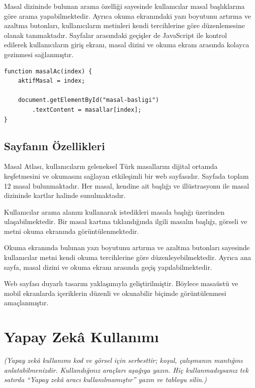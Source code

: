 \documentclass[12pt,a4paper]{article}
\newcommand{\aciklama}[1]{{\color{gray}\itshape (#1)}}
\begin{document}
Masal dizininde bulunan arama özelliği sayesinde kullanıcılar masal başlıklarına göre arama yapabilmektedir. Ayrıca okuma ekranındaki yazı boyutunu artırma ve azaltma butonları, kullanıcıların metinleri kendi tercihlerine göre düzenlemesine olanak tanımaktadır. Sayfalar arasındaki geçişler de JavaScript ile kontrol edilerek kullanıcıların giriş ekranı, masal dizini ve okuma ekranı arasında kolayca gezinmesi sağlanmıştır.

\begin{lstlisting}[caption={İçsel JavaScript'ten önemli bir bölüm}]
function masalAc(index) {
    aktifMasal = index;

    document.getElementById("masal-basligi")
        .textContent = masallar[index];
}
\end{lstlisting}

\subsection{Sayfanın Özellikleri}

Masal Atlası, kullanıcıların geleneksel Türk masallarını dijital ortamda keşfetmesini ve okumasını sağlayan etkileşimli bir web sayfasıdır. Sayfada toplam 12 masal bulunmaktadır. Her masal, kendine ait başlığı ve illüstrasyonu ile masal dizininde kartlar halinde sunulmaktadır.

Kullanıcılar arama alanını kullanarak istedikleri masala başlığı üzerinden ulaşabilmektedir. Bir masal kartına tıklandığında ilgili masalın başlığı, görseli ve metni okuma ekranında görüntülenmektedir.

Okuma ekranında bulunan yazı boyutunu artırma ve azaltma butonları sayesinde kullanıcılar metni kendi okuma tercihlerine göre düzenleyebilmektedir. Ayrıca ana sayfa, masal dizini ve okuma ekranı arasında geçiş yapılabilmektedir.

Web sayfası duyarlı tasarım yaklaşımıyla geliştirilmiştir. Böylece masaüstü ve mobil ekranlarda içeriklerin düzenli ve okunabilir biçimde görüntülenmesi amaçlanmıştır.


\section{Yapay Zekâ Kullanımı}
\aciklama{Yapay zekâ kullanımı kod ve görsel için serbesttir; koşul, çalışmanın mantığını
anlatabilmenizdir. Kullandığınız araçları aşağıya yazın. Hiç kullanmadıysanız tek
satırda ``Yapay zekâ aracı kullanılmamıştır'' yazın ve tabloyu silin.}
\end{document}
